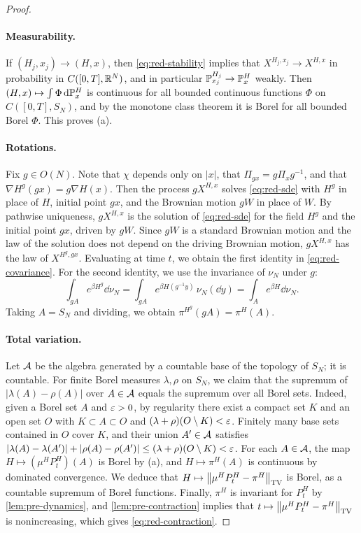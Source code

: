 \begin{proof}
\paragraph{Measurability.}
If $(H_j,x_j)\to(H,x)$, then \eqref{eq:red-stability} implies that $X^{H_j,x_j}\to X^{H,x}$ in probability in $C([0,T],\mathbb R^N)$, and in particular $\mathbb P^{H_j}_{x_j}\to\mathbb P^H_x$ weakly. Then $(H,x)\mapsto\int\Phi\,\mathrm d\mathbb P^H_x$ is continuous for all bounded continuous functions $\Phi$ on $C([0,T],S_N)$, and by the monotone class theorem it is Borel for all bounded Borel $\Phi$. This proves (a).

\paragraph{Rotations.}
Fix $g\in O(N)$. Note that $\chi$ depends only on $|x|$, that $\Pi_{gx}=g\Pi_xg^{-1}$, and that $\nabla H^g(gx)=g\nabla H(x)$. Then the process $gX^{H,x}$ solves \eqref{eq:red-sde} with $H^g$ in place of $H$, initial point $gx$, and the Brownian motion $gW$ in place of $W$. By pathwise uniqueness, $gX^{H,x}$ is the solution of \eqref{eq:red-sde} for the field $H^g$ and the initial point $gx$, driven by $gW$. Since $gW$ is a standard Brownian motion and the law of the solution does not depend on the driving Brownian motion, $gX^{H,x}$ has the law of $X^{H^g,gx}$. Evaluating at time $t$, we obtain the first identity in \eqref{eq:red-covariance}. For the second identity, we use the invariance of $\nu_N$ under $g$:
\begin{equation*}
\int_{gA}e^{\beta H^g}\dd\nu_N=\int_{gA}e^{\beta H(g^{-1}y)}\,\nu_N(\dd y)=\int_Ae^{\beta H}\dd\nu_N.
\end{equation*}
Taking $A=S_N$ and dividing, we obtain $\pi^{H^g}(gA)=\pi^H(A)$.

\paragraph{Total variation.}
Let $\mathcal A$ be the algebra generated by a countable base of the topology of $S_N$; it is countable. For finite Borel measures $\lambda,\rho$ on $S_N$, we claim that the supremum of $|\lambda(A)-\rho(A)|$ over $A\in\mathcal A$ equals the supremum over all Borel sets. Indeed, given a Borel set $A$ and $\varepsilon>0$, by regularity there exist a compact set $K$ and an open set $O$ with $K\subset A\subset O$ and $(\lambda+\rho)(O\setminus K)<\varepsilon$. Finitely many base sets contained in $O$ cover $K$, and their union $A'\in\mathcal A$ satisfies $|\lambda(A)-\lambda(A')|+|\rho(A)-\rho(A')|\le(\lambda+\rho)(O\setminus K)<\varepsilon$. For each $A\in\mathcal A$, the map $H\mapsto(\mu^HP^H_t)(A)$ is Borel by (a), and $H\mapsto\pi^H(A)$ is continuous by dominated convergence. We deduce that $H\mapsto\left\lVert\mu^HP^H_t-\pi^H\right\rVert_{\mathrm{TV}}$ is Borel, as a countable supremum of Borel functions. Finally, $\pi^H$ is invariant for $P^H_t$ by \cref{lem:pre-dynamics}, and \cref{lem:pre-contraction} implies that $t\mapsto\left\lVert\mu^HP^H_t-\pi^H\right\rVert_{\mathrm{TV}}$ is nonincreasing, which gives \eqref{eq:red-contraction}.
\end{proof}

